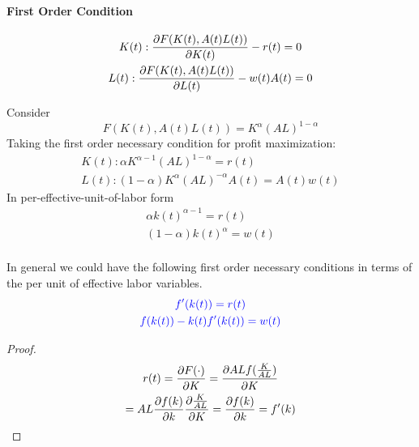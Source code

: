 \documentclass[11pt]{article}
\begin{document}
			\paragraph{First Order Condition}
			\begin{gather}
				K(t) : \frac{\partial{F(K(t), A(t)L(t))}}{\partial{K(t)}} - r(t) = 0 \\
				L(t) : \frac{\partial{F(K(t), A(t)L(t))}}{\partial{L(t)}} - w(t)A(t) = 0
			\end{gather}
			
			\begin{example}
				Consider 
				\begin{equation}
					F(K(t), A(t)L(t)) = K^\alpha (AL)^{1-\alpha}
				\end{equation}
				Taking the first order necessary condition for profit maximization:
				\begin{gather}
					K(t) : \alpha K^{\alpha - 1} (AL)^{1-\alpha} = r(t)\\
					L(t) : (1-\alpha) K^\alpha (AL)^{-\alpha}A(t) =A(t) w(t)
				\end{gather}
				In per-effective-unit-of-labor form
				\begin{gather}
					\alpha k(t) ^ {\alpha - 1} = r(t) \\
					(1-\alpha) k(t) ^ \alpha = w(t) \\
				\end{gather}
			\end{example}
			In general we could have the following first order necessary conditions in terms of the per unit of effective labor variables.
			\begin{gather}
			\textcolor{blue}{
				f'(k(t)) = r(t)
			} \\
			\textcolor{blue}{
				f(k(t)) - k(t) f'(k(t)) = w(t)
			}
			\end{gather}
			
			\begin{proof}
    			\begin{gather}
    			    r(t) = \frac{\partial{F(\cdot)}}{\partial{K}} 
    			    = \frac{\partial{AL f(\frac{K}{AL})}}{\partial{K}} \\
    			    = AL \frac{\partial{f(k)}}{\partial{k}} \frac{\partial{\frac{K}{AL}}}{\partial{K}} 
    			    = \frac{\partial{f(k)}}{\partial{k}} 
    			    = f'(k)
    			\end{gather}
			\end{proof}
			
\end{document}
